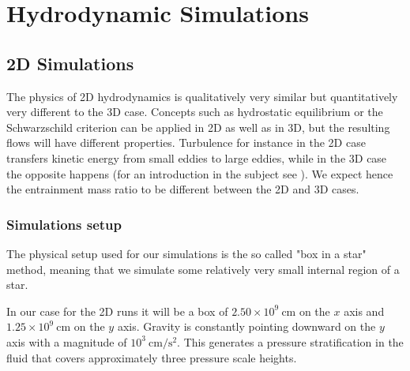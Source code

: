 
\chapter{Hydrodynamic Simulations}
\section{2D Simulations}
The physics of 2D hydrodynamics is qualitatively very similar but quantitatively very different to the 3D case. Concepts such as hydrostatic equilibrium or the Schwarzschild criterion can be applied in 2D as well as in 3D, but the resulting flows will have different properties. Turbulence for instance in the 2D case transfers kinetic energy from small eddies to large eddies, while in the 3D case the opposite happens (for an introduction in the subject see \citet{boffetta}). We expect hence the entrainment mass ratio to be different between the 2D and 3D cases. 

	
\subsection{Simulations setup}
The physical setup used for our simulations is the so called "box in a star" method, meaning that we simulate some relatively very small internal region of a star. 

In our case for the 2D runs it will be a box of $2.50 \times 10^{9} \ \mathrm{cm}$ on the $x$ axis and $1.25 \times 10^{9} \ \mathrm{cm}$ on the $y$ axis. Gravity is constantly pointing downward on the $y$ axis with a magnitude of $10^3 \ \mathrm{cm/s^2}$. This generates a pressure stratification in the fluid that covers approximately three pressure scale heights. 

